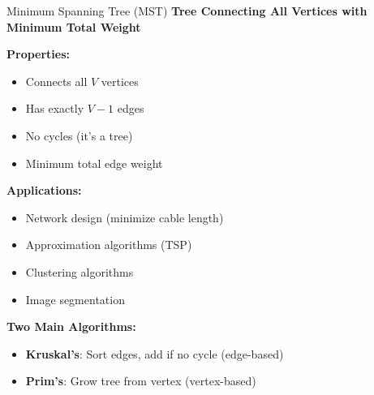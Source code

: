 \documentclass[aspectratio=169]{beamer}
\begin{document}
\begin{frame}{Minimum Spanning Tree (MST)}
  \textbf{Tree Connecting All Vertices with Minimum Total Weight}

  \vspace{0.3cm}
  \textbf{Properties:}
  \begin{itemize}
    \item Connects all $V$ vertices
    \item Has exactly $V-1$ edges
    \item No cycles (it's a tree)
    \item Minimum total edge weight
  \end{itemize}

  \vspace{0.3cm}
  \textbf{Applications:}
  \begin{itemize}
    \item Network design (minimize cable length)
    \item Approximation algorithms (TSP)
    \item Clustering algorithms
    \item Image segmentation
  \end{itemize}

  \vspace{0.3cm}
  \textbf{Two Main Algorithms:}
  \begin{itemize}
    \item \textbf{Kruskal's}: Sort edges, add if no cycle (edge-based)
    \item \textbf{Prim's}: Grow tree from vertex (vertex-based)
  \end{itemize}
\end{frame}
\end{document}
